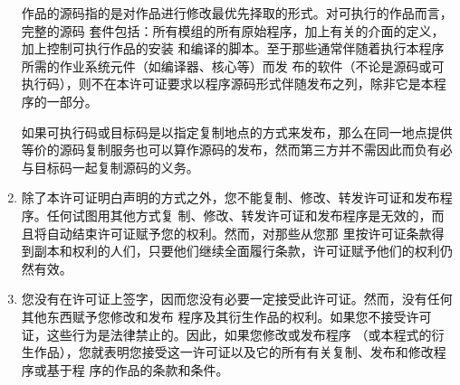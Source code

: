 \begin{enumerate}
        作品的源码指的是对作品进行修改最优先择取的形式。对可执行的作品而言，完整的源码 套件包括：所有模组的所有原始程序，加上有关的介面的定义，加上控制可执行作品的安装 和编译的脚本。至于那些通常伴随着执行本程序所需的作业系统元件（如编译器、核心等）而发 布的软件（不论是源码或可执行码），则不在本许可证要求以程序源码形式伴随发布之列，除非它是本程 序的一部分。


        如果可执行码或目标码是以指定复制地点的方式来发布，那么在同一地点提供等价的源码复制服务也可以算作源码的发布，然而第三方并不需因此而负有必与目标码一起复制源码的义务。
    \item 除了本许可证明白声明的方式之外，您不能复制、修改、转发许可证和发布程序。任何试图用其他方式复 制、修改、转发许可证和发布程序是无效的，而且将自动结束许可证赋予您的权利。然而，对那些从您那 里按许可证条款得到副本和权利的人们，只要他们继续全面履行条款，许可证赋予他们的权利仍然有效。
    \item 您没有在许可证上签字，因而您没有必要一定接受此许可证。然而，没有任何其他东西赋予您修改和发布 程序及其衍生作品的权利。如果您不接受许可证，这些行为是法律禁止的。因此，如果您修改或发布程序 （或本程式的衍生作品），您就表明您接受这一许可证以及它的所有有关复制、发布和修改程序或基于程 序的作品的条款和条件。

\end{enumerate}
